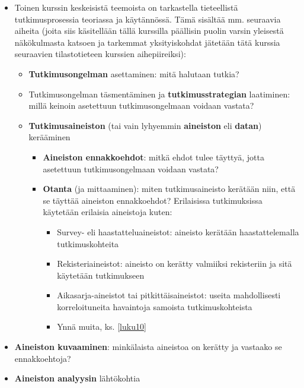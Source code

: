 \documentclass[
]{book}
\providecommand{\tightlist}{%
  \setlength{\itemsep}{0pt}\setlength{\parskip}{0pt}}
\begin{document}
\begin{itemize}
\tightlist
\item
  Toinen kurssin keskeisistä teemoista on tarkastella tieteellistä tutkimusprosessia teoriassa ja käytännössä. Tämä sisältää mm. seuraavia aiheita (joita siis käsitellään tällä kurssilla päällisin puolin varsin yleisestä näkökulmasta katsoen ja tarkemmat yksityiskohdat jätetään tätä kurssia seuraavien tilastotieteen kurssien aihepiireiksi):

  \begin{itemize}
  \tightlist
  \item
    \textbf{Tutkimusongelman} asettaminen: mitä halutaan tutkia?
  \item
    Tutkimusongelman täsmentäminen ja \textbf{tutkimusstrategian} laatiminen: millä keinoin asetettuun tutkimusongelmaan voidaan vastata?
  \item
    \textbf{Tutkimusaineiston} (tai vain lyhyemmin \textbf{aineiston} eli \textbf{datan}) kerääminen

    \begin{itemize}
    \tightlist
    \item
      \textbf{Aineiston ennakkoehdot}: mitkä ehdot tulee täyttyä, jotta asetettuun tutkimusongelmaan voidaan vastata?
    \item
      \textbf{Otanta} (ja mittaaminen): miten tutkimusaineisto kerätään niin, että se täyttää aineiston ennakkoehdot? Erilaisissa tutkimuksissa käytetään erilaisia aineistoja kuten:

      \begin{itemize}
      \tightlist
      \item
        Survey- eli haastatteluaineistot: aineisto kerätään haastattelemalla tutkimuskohteita
      \item
        Rekisteriaineistot: aineisto on kerätty valmiiksi rekisteriin ja sitä käytetään tutkimukseen
      \item
        Aikasarja-aineistot tai pitkittäisaineistot: useita mahdollisesti korreloituneita havaintoja samoista tutkimuskohteista
      \item
        Ynnä muita, ks. \ref{luku10}
      \end{itemize}
    \end{itemize}
  \end{itemize}
\item
  \textbf{Aineiston kuvaaminen}: minkälaista aineistoa on kerätty ja vastaako se ennakkoehtoja?
\item
  \textbf{Aineiston analyysin} lähtökohtia


\end{itemize}
\end{document}
